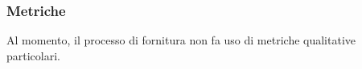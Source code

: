 		\subsubsection{Metriche}
				Al momento, il processo di fornitura non fa uso di metriche qualitative particolari.


%
